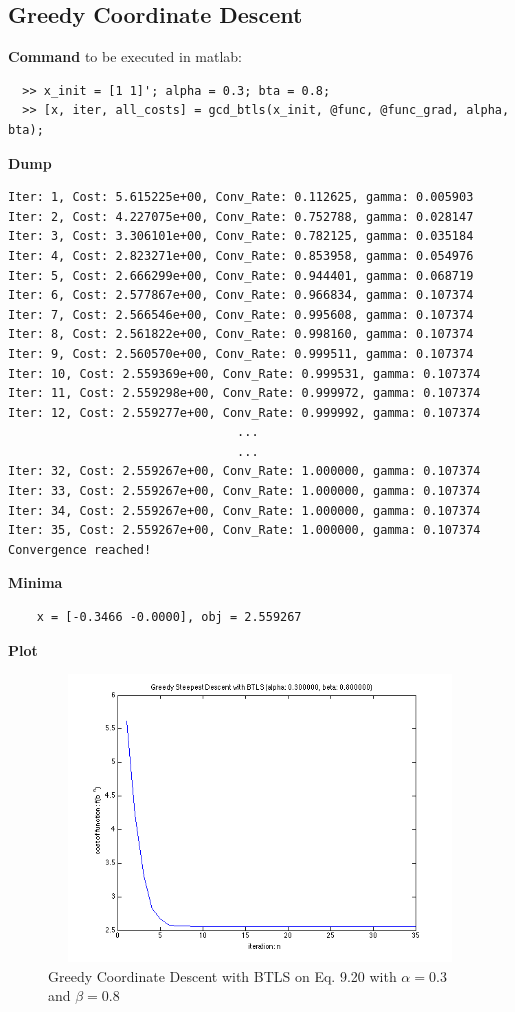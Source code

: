 \documentclass[11pt,a4paper]{article}
\begin{document}
\subsection{Greedy Coordinate Descent}
{\bf Command} to be executed in matlab:
\begin{verbatim}
  >> x_init = [1 1]'; alpha = 0.3; bta = 0.8;
  >> [x, iter, all_costs] = gcd_btls(x_init, @func, @func_grad, alpha, bta);
\end{verbatim}
{\bf Dump}
\begin{verbatim}
Iter: 1, Cost: 5.615225e+00, Conv_Rate: 0.112625, gamma: 0.005903
Iter: 2, Cost: 4.227075e+00, Conv_Rate: 0.752788, gamma: 0.028147
Iter: 3, Cost: 3.306101e+00, Conv_Rate: 0.782125, gamma: 0.035184
Iter: 4, Cost: 2.823271e+00, Conv_Rate: 0.853958, gamma: 0.054976
Iter: 5, Cost: 2.666299e+00, Conv_Rate: 0.944401, gamma: 0.068719
Iter: 6, Cost: 2.577867e+00, Conv_Rate: 0.966834, gamma: 0.107374
Iter: 7, Cost: 2.566546e+00, Conv_Rate: 0.995608, gamma: 0.107374
Iter: 8, Cost: 2.561822e+00, Conv_Rate: 0.998160, gamma: 0.107374
Iter: 9, Cost: 2.560570e+00, Conv_Rate: 0.999511, gamma: 0.107374
Iter: 10, Cost: 2.559369e+00, Conv_Rate: 0.999531, gamma: 0.107374
Iter: 11, Cost: 2.559298e+00, Conv_Rate: 0.999972, gamma: 0.107374
Iter: 12, Cost: 2.559277e+00, Conv_Rate: 0.999992, gamma: 0.107374
                                ...
                                ...
Iter: 32, Cost: 2.559267e+00, Conv_Rate: 1.000000, gamma: 0.107374
Iter: 33, Cost: 2.559267e+00, Conv_Rate: 1.000000, gamma: 0.107374
Iter: 34, Cost: 2.559267e+00, Conv_Rate: 1.000000, gamma: 0.107374
Iter: 35, Cost: 2.559267e+00, Conv_Rate: 1.000000, gamma: 0.107374
Convergence reached!
\end{verbatim}
{\bf Minima}
\begin{verbatim}
    x = [-0.3466 -0.0000], obj = 2.559267 
   \end{verbatim}
{\bf Plot}
\begin{figure}[h]
    \centering
    \includegraphics[width=5in,height=3in]{../ps2_matlab/5.png}
    \caption{Greedy Coordinate Descent with BTLS on
        Eq. 9.20 with $\alpha = 0.3$ and $\beta = 0.8$}
\end{figure}
\end{document}
